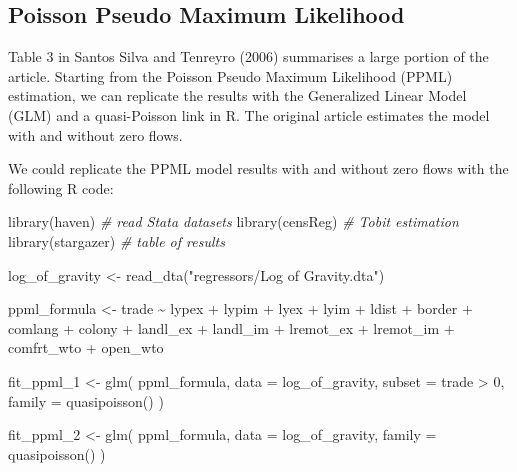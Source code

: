 \documentclass[letterpaper,twoside,12pt]{article}
\newenvironment{Shaded}{\begin{snugshade}}{\end{snugshade}}
\newcommand{\AttributeTok}[1]{\textcolor[rgb]{0.77,0.63,0.00}{#1}}
\newcommand{\CommentTok}[1]{\textcolor[rgb]{0.56,0.35,0.01}{\textit{#1}}}
\newcommand{\DecValTok}[1]{\textcolor[rgb]{0.00,0.00,0.81}{#1}}
\newcommand{\FunctionTok}[1]{\textcolor[rgb]{0.00,0.00,0.00}{#1}}
\newcommand{\NormalTok}[1]{#1}
\newcommand{\OtherTok}[1]{\textcolor[rgb]{0.56,0.35,0.01}{#1}}
\newcommand{\SpecialCharTok}[1]{\textcolor[rgb]{0.00,0.00,0.00}{#1}}
\newcommand{\StringTok}[1]{\textcolor[rgb]{0.31,0.60,0.02}{#1}}
\begin{document}
\subsection{Poisson Pseudo Maximum
Likelihood}\label{poisson-pseudo-maximum-likelihood}

Table 3 in Santos Silva and Tenreyro (2006) summarises a large portion
of the article. Starting from the Poisson Pseudo Maximum Likelihood
(PPML) estimation, we can replicate the results with the Generalized
Linear Model (GLM) and a quasi-Poisson link in R. The original article
estimates the model with and without zero flows.

We could replicate the PPML model results with and without zero flows
with the following R code:

\begin{Shaded}
\begin{Highlighting}[]
\FunctionTok{library}\NormalTok{(haven) }\CommentTok{\# read Stata datasets}
\FunctionTok{library}\NormalTok{(censReg) }\CommentTok{\# Tobit estimation}
\FunctionTok{library}\NormalTok{(stargazer) }\CommentTok{\# table of results}

\NormalTok{log\_of\_gravity }\OtherTok{\textless{}{-}} \FunctionTok{read\_dta}\NormalTok{(}\StringTok{"regressors/Log of Gravity.dta"}\NormalTok{)}

\NormalTok{ppml\_formula }\OtherTok{\textless{}{-}}\NormalTok{ trade }\SpecialCharTok{\textasciitilde{}}\NormalTok{ lypex }\SpecialCharTok{+}\NormalTok{ lypim }\SpecialCharTok{+}\NormalTok{ lyex }\SpecialCharTok{+}\NormalTok{ lyim }\SpecialCharTok{+}\NormalTok{ ldist }\SpecialCharTok{+}\NormalTok{ border }\SpecialCharTok{+}
\NormalTok{  comlang }\SpecialCharTok{+}\NormalTok{ colony }\SpecialCharTok{+}\NormalTok{ landl\_ex }\SpecialCharTok{+}\NormalTok{ landl\_im }\SpecialCharTok{+}\NormalTok{ lremot\_ex }\SpecialCharTok{+}\NormalTok{ lremot\_im }\SpecialCharTok{+}
\NormalTok{  comfrt\_wto }\SpecialCharTok{+}\NormalTok{ open\_wto}

\NormalTok{fit\_ppml\_1 }\OtherTok{\textless{}{-}} \FunctionTok{glm}\NormalTok{(}
\NormalTok{  ppml\_formula,}
  \AttributeTok{data =}\NormalTok{ log\_of\_gravity,}
  \AttributeTok{subset =}\NormalTok{ trade }\SpecialCharTok{\textgreater{}} \DecValTok{0}\NormalTok{,}
  \AttributeTok{family =} \FunctionTok{quasipoisson}\NormalTok{()}
\NormalTok{)}

\NormalTok{fit\_ppml\_2 }\OtherTok{\textless{}{-}} \FunctionTok{glm}\NormalTok{(}
\NormalTok{  ppml\_formula,}
  \AttributeTok{data =}\NormalTok{ log\_of\_gravity,}
  \AttributeTok{family =} \FunctionTok{quasipoisson}\NormalTok{()}
\NormalTok{)}
\end{Highlighting}
\end{Shaded}
\end{document}
